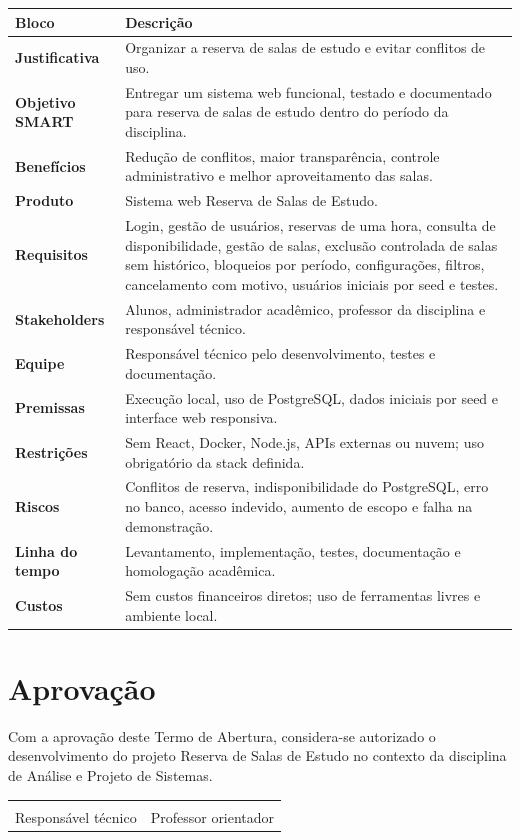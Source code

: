 \documentclass[12pt,a4paper]{article}
\begin{document}
\begin{longtable}{|p{3.5cm}|p{11.5cm}|}
\hline
\textbf{Bloco} & \textbf{Descrição} \\ \hline
\textbf{Justificativa} & Organizar a reserva de salas de estudo e evitar conflitos de uso. \\ \hline
\textbf{Objetivo SMART} & Entregar um sistema web funcional, testado e documentado para reserva de salas de estudo dentro do período da disciplina. \\ \hline
\textbf{Benefícios} & Redução de conflitos, maior transparência, controle administrativo e melhor aproveitamento das salas. \\ \hline
\textbf{Produto} & Sistema web Reserva de Salas de Estudo. \\ \hline
\textbf{Requisitos} & Login, gestão de usuários, reservas de uma hora, consulta de disponibilidade, gestão de salas, exclusão controlada de salas sem histórico, bloqueios por período, configurações, filtros, cancelamento com motivo, usuários iniciais por seed e testes. \\ \hline
\textbf{Stakeholders} & Alunos, administrador acadêmico, professor da disciplina e responsável técnico. \\ \hline
\textbf{Equipe} & Responsável técnico pelo desenvolvimento, testes e documentação. \\ \hline
\textbf{Premissas} & Execução local, uso de PostgreSQL, dados iniciais por seed e interface web responsiva. \\ \hline
\textbf{Restrições} & Sem React, Docker, Node.js, APIs externas ou nuvem; uso obrigatório da stack definida. \\ \hline
\textbf{Riscos} & Conflitos de reserva, indisponibilidade do PostgreSQL, erro no banco, acesso indevido, aumento de escopo e falha na demonstração. \\ \hline
\textbf{Linha do tempo} & Levantamento, implementação, testes, documentação e homologação acadêmica. \\ \hline
\textbf{Custos} & Sem custos financeiros diretos; uso de ferramentas livres e ambiente local. \\ \hline
\end{longtable}

\section{Aprovação}

Com a aprovação deste Termo de Abertura, considera-se autorizado o desenvolvimento do projeto Reserva de Salas de Estudo no contexto da disciplina de Análise e Projeto de Sistemas.

\vspace{1.5cm}

\begin{center}
\begin{tabular}{p{7cm}p{7cm}}
\hrulefill & \hrulefill \\
Responsável técnico & Professor orientador \\
\end{tabular}
\end{center}
\end{document}

